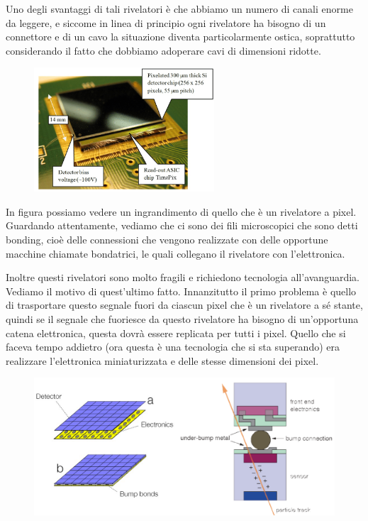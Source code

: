 Uno degli svantaggi di tali rivelatori è che abbiamo un numero di canali enorme da leggere, e siccome in linea di principio ogni rivelatore ha bisogno di un connettore e di un cavo la situazione diventa particolarmente ostica, soprattutto considerando il fatto che dobbiamo adoperare cavi di dimensioni ridotte.
\begin{figure}[H]
   \centering
   \includegraphics[width=0.6\textwidth]{immagini/zoom_rivelatore_silicio.png}
\end{figure}
In figura possiamo vedere un ingrandimento di quello che è un rivelatore a pixel. Guardando attentamente, vediamo che ci sono dei fili microscopici che sono detti bonding, cioè delle connessioni che vengono realizzate con delle opportune macchine chiamate bondatrici, le quali collegano il rivelatore con l'elettronica.

Inoltre questi rivelatori sono molto fragili e richiedono tecnologia all'avanguardia. Vediamo il motivo di quest'ultimo fatto. Innanzitutto il primo problema è quello di trasportare questo segnale fuori da ciascun pixel che è un rivelatore a sé stante, quindi se il segnale che fuoriesce da questo rivelatore ha bisogno di un'opportuna catena elettronica, questa dovrà essere replicata per tutti i pixel. Quello che si faceva tempo addietro (ora questa è una tecnologia che si sta superando) era realizzare l'elettronica miniaturizzata e delle stesse dimensioni dei pixel.

\begin{figure}[H]
   \centering
   \includegraphics[width=\textwidth]{immagini/connessione_rivelatore_a_pixel.png}
\end{figure}

